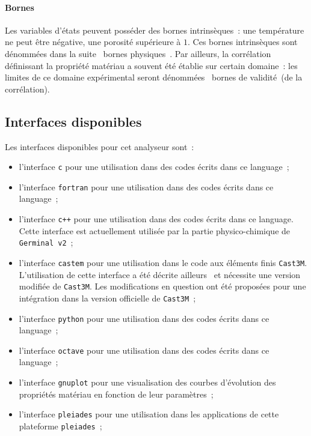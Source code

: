 \documentclass[12pt]{article}
\newcommand{\pleiades}{\texttt{pleiades}}
\newcommand{\castem}{\texttt{Cast3M}}
\begin{document}
\paragraph{Bornes} Les variables d'états peuvent posséder des bornes
intrinsèques~: une température ne peut être négative, une porosité
supérieure à \(1\). Ces bornes intrinsèques sont dénommées dans la
suite \og~bornes physiques~\fg. Par ailleurs, la corrélation définissant
la propriété matériau a souvent été établie sur certain domaine~:
les limites de ce domaine expérimental seront dénommées
\og~bornes de validité~\fg (de la corrélation). 

\subsection{Interfaces disponibles} Les interfaces disponibles pour cet analyseur
sont~:
\begin{itemize}
\item l'interface \texttt{c} pour une utilisation dans des codes écrits
  dans ce language~;
\item l'interface \texttt{fortran} pour une utilisation dans des codes
  écrits dans ce language~;
\item l'interface \texttt{c++} pour une utilisation dans des codes écrits
  dans ce language. Cette interface est actuellement utilisée par la
  partie physico-chimique de \texttt{Germinal v2}~;
\item l'interface \texttt{castem} pour une utilisation dans le code aux
  éléments finis \castem{}. L'utilisation de cette interface a été
  décrite ailleurs~\cite{helfer07:_utilis} et nécessite une version
  modifiée de \castem{}. Les modifications en question ont été
  proposées pour une intégration dans la version officielle de
  \castem{}~;
\item l'interface \texttt{python} pour une utilisation dans des codes écrits
  dans ce language~;
\item l'interface \texttt{octave} pour une utilisation dans des codes écrits
  dans ce language~;
\item l'interface \texttt{gnuplot} pour une visualisation des courbes d'évolution
  des propriétés matériau en fonction de leur paramètres~;
\item l'interface \texttt{pleiades} pour une utilisation dans les applications
  de cette plateforme \pleiades{}~;
\end{itemize}
\end{document}
